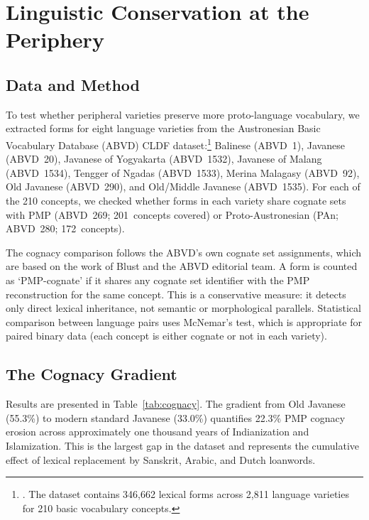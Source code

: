 \documentclass[12pt,a4paper]{article}
\begin{document}
\section{Linguistic Conservation at the Periphery}
\label{sec:linguistic}

\subsection{Data and Method}
\label{sec:cognacy}

To test whether peripheral varieties preserve more proto-language vocabulary, we extracted forms for eight language varieties from the Austronesian Basic Vocabulary Database (ABVD) CLDF dataset:\footnote{\autocite{greenhill2008abvd}. The dataset contains 346,662 lexical forms across 2,811 language varieties for 210 basic vocabulary concepts.} Balinese (ABVD~1), Javanese (ABVD~20), Javanese of Yogyakarta (ABVD~1532), Javanese of Malang (ABVD~1534), Tengger of Ngadas (ABVD~1533), Merina Malagasy (ABVD~92), Old Javanese (ABVD~290), and Old/Middle Javanese (ABVD~1535). For each of the 210 concepts, we checked whether forms in each variety share cognate sets with PMP (ABVD~269; 201~concepts covered) or Proto-Austronesian (PAn; ABVD~280; 172~concepts).

The cognacy comparison follows the ABVD's own cognate set assignments, which are based on the work of Blust and the ABVD editorial team. A form is counted as `PMP-cognate' if it shares any cognate set identifier with the PMP reconstruction for the same concept. This is a conservative measure: it detects only direct lexical inheritance, not semantic or morphological parallels. Statistical comparison between language pairs uses McNemar's test, which is appropriate for paired binary data (each concept is either cognate or not in each variety).

\subsection{The Cognacy Gradient}

Results are presented in Table~\ref{tab:cognacy}. The gradient from Old Javanese (55.3\%) to modern standard Javanese (33.0\%) quantifies 22.3\% PMP cognacy erosion across approximately one thousand years of Indianization and Islamization. This is the largest gap in the dataset and represents the cumulative effect of lexical replacement by Sanskrit, Arabic, and Dutch loanwords.
\end{document}
